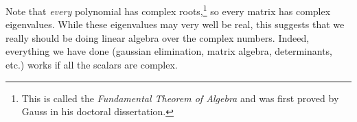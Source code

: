 Note that \textit{every} polynomial has complex roots,\footnote{This is called the \textit{Fundamental Theorem of Algebra} and was first proved by Gauss in his doctoral dissertation.} so every matrix has complex eigenvalues. While these eigenvalues may very well be real, this suggests that we really should be doing linear algebra over the complex numbers. Indeed, everything we have done (gaussian elimination, matrix algebra, determinants, etc.) works if all the scalars are complex.



